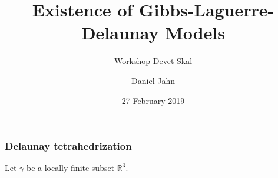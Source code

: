 \documentclass[c, 10pt]{beamer}
\title[Existence of Gibbs-Laguerre-Delaunay Models]{%
	Existence of Gibbs-Laguerre-Delaunay Models}
\subtitle[]{Workshop Devet Skal}
\author[jahn@karlin.mff.cuni.cz]{%
        Daniel Jahn}
\institute[KPMS]{%
           Department of Probability and Mathematical Statistics}
\date[27.2.2019]{%
      27 February 2019}
\begin{document}






\begin{frame}\frametitle{Delaunay tetrahedrization}
	Let $\gamma$ be a locally finite subset $\mathbb R^3$. 

	\vspace{8mm}




\end{frame}
\end{document}
